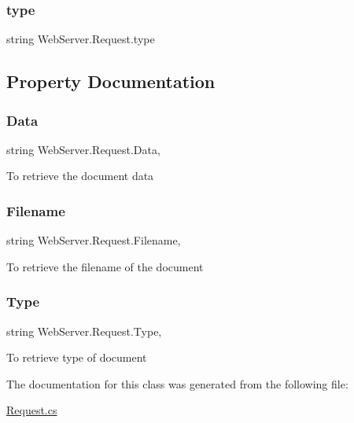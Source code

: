 \subsubsection{\texorpdfstring{type}{type}}
{\footnotesize\ttfamily string Web\+Server.\+Request.\+type\hspace{0.3cm}{\ttfamily [private]}}



\subsection{Property Documentation}
\mbox{\label{class_web_server_1_1_request_a42134399b1ac8892af03d7f0a52dcd2d}} 
\subsubsection{\texorpdfstring{Data}{Data}}
{\footnotesize\ttfamily string Web\+Server.\+Request.\+Data\hspace{0.3cm}{\ttfamily [get]}, {\ttfamily [set]}}



To retrieve the document data 

\mbox{\label{class_web_server_1_1_request_a1797bd8f10a7b7131cf7b90df7a250af}} 
\subsubsection{\texorpdfstring{Filename}{Filename}}
{\footnotesize\ttfamily string Web\+Server.\+Request.\+Filename\hspace{0.3cm}{\ttfamily [get]}, {\ttfamily [set]}}



To retrieve the filename of the document 

\mbox{\label{class_web_server_1_1_request_a97f8cec3d26773cdc2d227817be59bfe}} 
\subsubsection{\texorpdfstring{Type}{Type}}
{\footnotesize\ttfamily string Web\+Server.\+Request.\+Type\hspace{0.3cm}{\ttfamily [get]}, {\ttfamily [set]}}



To retrieve type of document 



The documentation for this class was generated from the following file\+:\begin{DoxyCompactItemize}
\item 
\hyperlink{_request_8cs}{Request.\+cs}\end{DoxyCompactItemize}
